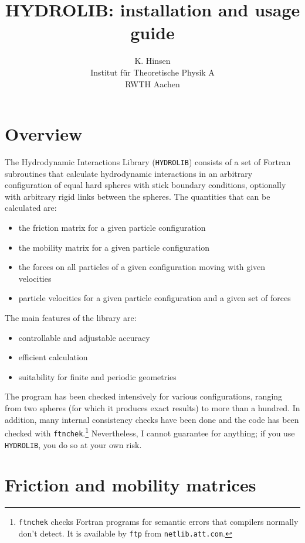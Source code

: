 \documentclass[12pt]{article}
\newcommand{\prog}[1]{{\tt #1}}
\begin{document}
\title{HYDROLIB: installation and usage guide}
\author{K. Hinsen\\
        Institut f\"ur Theoretische Physik A\\
        RWTH Aachen}
\date{}
\maketitle
\tableofcontents
\newpage

\section{Overview}

The Hydrodynamic Interactions Library (\prog{HYDROLIB}) consists of a
set of Fortran subroutines that calculate hydrodynamic interactions in
an arbitrary configuration of equal hard spheres with stick boundary
conditions, optionally with arbitrary rigid links between the
spheres. The quantities that can be calculated are:
\begin{itemize}
\item the friction matrix for a given particle configuration
\item the mobility matrix for a given particle configuration
\item the forces on all particles of a given configuration moving
with given velocities
\item particle velocities for a given particle configuration and a given set
of forces
\end{itemize}
The main features of the library are:
\begin{itemize}
\item controllable and adjustable accuracy
\item efficient calculation
\item suitability for finite and periodic geometries
\end{itemize}

The program has been checked intensively for various configurations,
ranging from two spheres (for which it produces exact results) to more
than a hundred. In addition, many internal consistency checks have
been done and the code has been checked with
\prog{ftnchek}.\footnote{\prog{ftnchek} checks Fortran programs for
semantic errors that compilers normally don't detect. It is available
by \prog{ftp} from \prog{netlib.att.com}.} Nevertheless, I cannot
guarantee for anything; if you use \prog{HYDROLIB}, you do so at your
own risk.


\section{Friction and mobility matrices}
\end{document}
